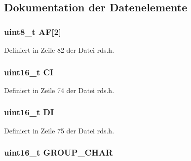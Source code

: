 \subsection{Dokumentation der Datenelemente}
\hypertarget{structgroup__0b_ae5a8515ae995b21e542b2ad52b20c34e}{}
\subsubsection[{A\+F}]{\setlength{\rightskip}{0pt plus 5cm}uint8\+\_\+t A\+F\mbox{[}2\mbox{]}}\label{structgroup__0b_ae5a8515ae995b21e542b2ad52b20c34e}


Definiert in Zeile 82 der Datei rds.\+h.

\hypertarget{structgroup__0b_aa6fd8556e02ce89fed23057f1cb37e44}{}
\subsubsection[{C\+I}]{\setlength{\rightskip}{0pt plus 5cm}uint16\+\_\+t C\+I}\label{structgroup__0b_aa6fd8556e02ce89fed23057f1cb37e44}


Definiert in Zeile 74 der Datei rds.\+h.

\hypertarget{structgroup__0b_ad020d0abff338c9c34924a44478ac591}{}
\subsubsection[{D\+I}]{\setlength{\rightskip}{0pt plus 5cm}uint16\+\_\+t D\+I}\label{structgroup__0b_ad020d0abff338c9c34924a44478ac591}


Definiert in Zeile 75 der Datei rds.\+h.

\hypertarget{structgroup__0b_a66d4119990dc4c3e040a43885e9bb953}{}
\subsubsection[{G\+R\+O\+U\+P\+\_\+\+C\+H\+A\+R}]{\setlength{\rightskip}{0pt plus 5cm}uint16\+\_\+t G\+R\+O\+U\+P\+\_\+\+C\+H\+A\+R}\label{structgroup__0b_a66d4119990dc4c3e040a43885e9bb953}


